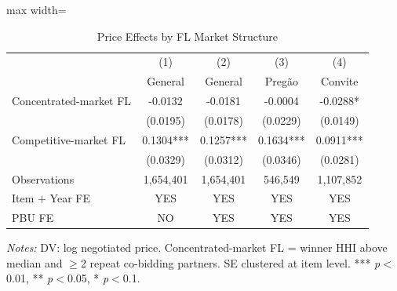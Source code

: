 \begin{table}[htbp]
\centering
\caption{Price Effects by FL Market Structure} %
\label{tab:network_split}
\begin{adjustbox}{max width=\textwidth}
\begin{threeparttable}
\small
\begin{tabular}{lcccc}
\toprule
 & (1) & (2) & (3) & (4) \\
 & General & General & Preg\~{a}o & Convite \\
\midrule
Concentrated-market FL & -0.0132 & -0.0181 & -0.0004 & -0.0288* \\
 & (0.0195) & (0.0178) & (0.0229) & (0.0149) \\
Competitive-market FL & 0.1304*** & 0.1257*** & 0.1634*** & 0.0911*** \\
 & (0.0329) & (0.0312) & (0.0346) & (0.0281) \\
\midrule
Observations & 1,654,401 & 1,654,401 & 546,549 & 1,107,852 \\
Item + Year FE & YES & YES & YES & YES \\
PBU FE & NO & YES & YES & YES \\
\bottomrule
\end{tabular}
\begin{tablenotes}
\small
\item \textit{Notes:} DV: log negotiated price.
Concentrated-market FL = winner HHI above median and $\geq$2 repeat co-bidding partners.
SE clustered at item level.
*** \textit{p}$<$0.01, ** \textit{p}$<$0.05, * \textit{p}$<$0.1.
\end{tablenotes}
\end{threeparttable}
\end{adjustbox}
\end{table}
